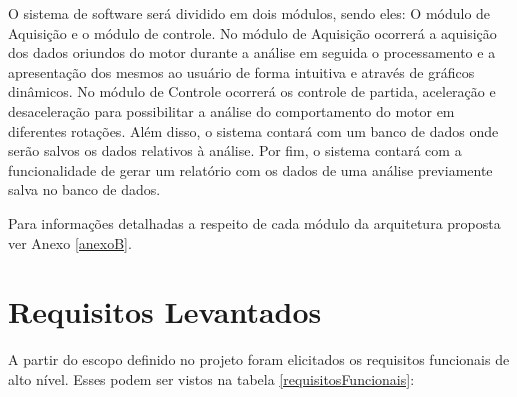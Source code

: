 O sistema de software será dividido em dois módulos, sendo eles: O módulo de Aquisição e o módulo de controle. No módulo de Aquisição ocorrerá a aquisição dos dados oriundos do motor durante a análise em seguida o processamento e a apresentação dos mesmos ao usuário de forma intuitiva e através de gráficos dinâmicos. No módulo de Controle ocorrerá os controle de partida, aceleração e desaceleração para possibilitar a análise do comportamento do motor em diferentes rotações. Além disso, o sistema contará com um banco de dados onde serão salvos os dados relativos à análise. Por fim, o sistema contará com a funcionalidade de gerar um relatório com os dados de uma análise previamente salva no banco de dados.

Para informações detalhadas a respeito de cada módulo da arquitetura proposta ver Anexo \ref{anexoB}.


\section{Requisitos Levantados}

A partir do escopo definido no projeto foram elicitados os requisitos funcionais de alto nível. Esses podem ser vistos na tabela \ref{requisitosFuncionais}:

